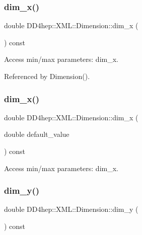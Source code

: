 \subsubsection{\texorpdfstring{dim\+\_\+x()}{dim\_x()}\hspace{0.1cm}{\footnotesize\ttfamily [1/2]}}
{\footnotesize\ttfamily double D\+D4hep\+::\+X\+M\+L\+::\+Dimension\+::dim\+\_\+x (\begin{DoxyParamCaption}{ }\end{DoxyParamCaption}) const}



Access min/max parameters\+: dim\+\_\+x. 



Referenced by Dimension().

\hypertarget{struct_d_d4hep_1_1_x_m_l_1_1_dimension_a54a0c2165c23d4c9b936d62ce150f569}{}\label{struct_d_d4hep_1_1_x_m_l_1_1_dimension_a54a0c2165c23d4c9b936d62ce150f569} 
\subsubsection{\texorpdfstring{dim\+\_\+x()}{dim\_x()}\hspace{0.1cm}{\footnotesize\ttfamily [2/2]}}
{\footnotesize\ttfamily double D\+D4hep\+::\+X\+M\+L\+::\+Dimension\+::dim\+\_\+x (\begin{DoxyParamCaption}\item[{double}]{default\+\_\+value }\end{DoxyParamCaption}) const}



Access min/max parameters\+: dim\+\_\+x. 

\hypertarget{struct_d_d4hep_1_1_x_m_l_1_1_dimension_a8e497516b52699f3b97c989f8a5c7341}{}\label{struct_d_d4hep_1_1_x_m_l_1_1_dimension_a8e497516b52699f3b97c989f8a5c7341} 
\subsubsection{\texorpdfstring{dim\+\_\+y()}{dim\_y()}\hspace{0.1cm}{\footnotesize\ttfamily [1/2]}}
{\footnotesize\ttfamily double D\+D4hep\+::\+X\+M\+L\+::\+Dimension\+::dim\+\_\+y (\begin{DoxyParamCaption}{ }\end{DoxyParamCaption}) const}




